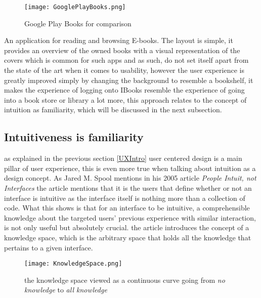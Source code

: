 \begin{figure}[H]
\centering
\texttt{[image: GooglePlayBooks.png]}
\caption{Google Play Books for comparison}
\end{figure}
An application for reading and browsing E-books. The layout is simple, it 
provides an overview of the owned books with a visual representation of the 
covers which is common for such apps and as such, do not set itself apart from 
the state of the art when it comes to usability, however the user experience is 
greatly improved simply by changing the background to resemble a bookshelf, it 
makes the experience of logging onto IBooks resemble the experience of going into 
a book store or library a lot more, this approach relates to the concept of 
intuition as familiarity, which will be discussed in the next subsection.   
\subsection{Intuitiveness is familiarity}
as explained in the previous section \ref{UXIntro} user centered design is a main 
pillar of user experience, this is even more true when talking about intuition as 
a design concept. As Jared M. Spool mentions in his 2005 article \textit{People 
Intuit, not Interfaces}\cite{JaredMSpool} the article mentions that it is the 
users that define whether or not an interface is intuitive as the interface 
itself is nothing more than a collection of code. What this shows is that for an 
interface to be intuitive, a comprehensible knowledge about the targeted users' 
previous experience with similar interaction, is not only useful but absolutely 
crucial. the article introduces the concept of a knowledge space, which is the 
arbitrary space that holds all the knowledge that pertains to a given interface. 

\begin{figure}[H]
\centering
\texttt{[image: KnowledgeSpace.png]}
\caption{the knowledge space viewed as a continuous curve going from \textit{no 
knowledge} to \textit{all knowledge} \cite{JaredMSpool}}
\label{fig:Knowledge}
\end{figure}

